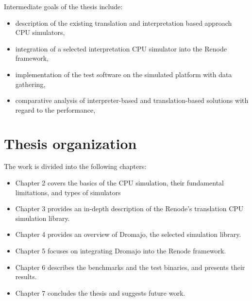 \noindent Intermediate goals of the thesis include:
\begin{itemize}
	\item{description of the existing translation and interpretation based approach CPU simulators,}
	\item{integration of a selected interpretation CPU simulator into the Renode framework,}
	\item{implementation of the test software on the simulated platform with data gathering,}
	\item{comparative analysis of interpreter-based and translation-based solutions with regard to the performance,}
\end{itemize}

\section{Thesis organization}

The work is divided into the following chapters:
\begin{itemize}
	\item{Chapter 2 covers the basics of the CPU simulation, their fundamental limitations, and types of simulators}
	\item{Chapter 3 provides an in-depth description of the Renode's translation CPU simulation library}.
	\item{Chapter 4 provides an overview of Dromajo, the selected simulation library}.
	\item{Chapter 5 focuses on integrating Dromajo into the Renode framework}.
	\item{Chapter 6 describes the benchmarks and the test binaries, and presents their results}.
	\item{Chapter 7 concludes the thesis and suggests future work}.
\end{itemize}